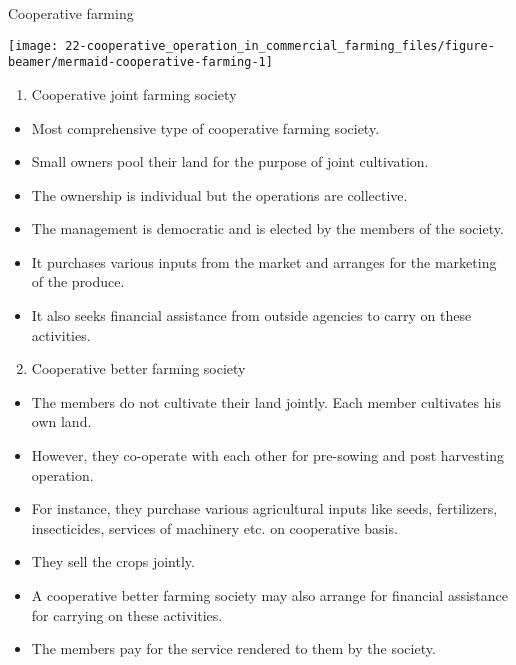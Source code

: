 \documentclass[12pt,ignorenonframetext,aspectratio=169]{beamer}
\providecommand{\tightlist}{%
  \setlength{\itemsep}{0pt}\setlength{\parskip}{0pt}}
\begin{document}
\begin{frame}{Cooperative farming}
\protect\hypertarget{cooperative-farming}{}
\footnotesize

\begin{center}\texttt{[image: 22-cooperative\_operation\_in\_commercial\_farming\_files/figure-beamer/mermaid-cooperative-farming-1]} \end{center}
\end{frame}

\begin{frame}{}
\protect\hypertarget{section}{}
\begin{enumerate}
\tightlist
\item
  Cooperative joint farming society
\end{enumerate}

\begin{itemize}
\tightlist
\item
  Most comprehensive type of cooperative farming society.
\item
  Small owners pool their land for the purpose of joint cultivation.
\item
  The ownership is individual but the operations are collective.
\item
  The management is democratic and is elected by the members of the
  society.
\item
  It purchases various inputs from the market and arranges for the
  marketing of the produce.
\item
  It also seeks financial assistance from outside agencies to carry on
  these activities.
\end{itemize}
\end{frame}

\begin{frame}{}
\protect\hypertarget{section-1}{}
\begin{enumerate}
\setcounter{enumi}{1}
\tightlist
\item
  Cooperative better farming society
\end{enumerate}

\begin{itemize}
\tightlist
\item
  The members do not cultivate their land jointly. Each member
  cultivates his own land.
\item
  However, they co-operate with each other for pre-sowing and post
  harvesting operation.
\item
  For instance, they purchase various agricultural inputs like seeds,
  fertilizers, insecticides, services of machinery etc. on cooperative
  basis.
\item
  They sell the crops jointly.
\item
  A cooperative better farming society may also arrange for financial
  assistance for carrying on these activities.
\item
  The members pay for the service rendered to them by the society.
\end{itemize}
\end{frame}
\end{document}
